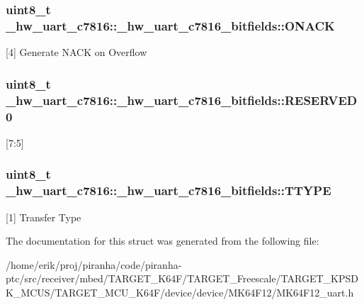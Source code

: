 \subsubsection[{\texorpdfstring{O\+N\+A\+CK}{ONACK}}]{\setlength{\rightskip}{0pt plus 5cm}uint8\+\_\+t \+\_\+hw\+\_\+uart\+\_\+c7816\+::\+\_\+hw\+\_\+uart\+\_\+c7816\+\_\+bitfields\+::\+O\+N\+A\+CK}\hypertarget{struct__hw__uart__c7816_1_1__hw__uart__c7816__bitfields_aab64c95bc1377e204598bee46957ade7}{}\label{struct__hw__uart__c7816_1_1__hw__uart__c7816__bitfields_aab64c95bc1377e204598bee46957ade7}
\mbox{[}4\mbox{]} Generate N\+A\+CK on Overflow 
\subsubsection[{\texorpdfstring{R\+E\+S\+E\+R\+V\+E\+D0}{RESERVED0}}]{\setlength{\rightskip}{0pt plus 5cm}uint8\+\_\+t \+\_\+hw\+\_\+uart\+\_\+c7816\+::\+\_\+hw\+\_\+uart\+\_\+c7816\+\_\+bitfields\+::\+R\+E\+S\+E\+R\+V\+E\+D0}\hypertarget{struct__hw__uart__c7816_1_1__hw__uart__c7816__bitfields_a16d6b831175a4c494e3145ef6cef56a0}{}\label{struct__hw__uart__c7816_1_1__hw__uart__c7816__bitfields_a16d6b831175a4c494e3145ef6cef56a0}
\mbox{[}7\+:5\mbox{]} 
\subsubsection[{\texorpdfstring{T\+T\+Y\+PE}{TTYPE}}]{\setlength{\rightskip}{0pt plus 5cm}uint8\+\_\+t \+\_\+hw\+\_\+uart\+\_\+c7816\+::\+\_\+hw\+\_\+uart\+\_\+c7816\+\_\+bitfields\+::\+T\+T\+Y\+PE}\hypertarget{struct__hw__uart__c7816_1_1__hw__uart__c7816__bitfields_a0c2ad54ab3c3b251db7f8f2c7c0a473a}{}\label{struct__hw__uart__c7816_1_1__hw__uart__c7816__bitfields_a0c2ad54ab3c3b251db7f8f2c7c0a473a}
\mbox{[}1\mbox{]} Transfer Type 

The documentation for this struct was generated from the following file\+:\begin{DoxyCompactItemize}
\item 
/home/erik/proj/piranha/code/piranha-\/ptc/src/receiver/mbed/\+T\+A\+R\+G\+E\+T\+\_\+\+K64\+F/\+T\+A\+R\+G\+E\+T\+\_\+\+Freescale/\+T\+A\+R\+G\+E\+T\+\_\+\+K\+P\+S\+D\+K\+\_\+\+M\+C\+U\+S/\+T\+A\+R\+G\+E\+T\+\_\+\+M\+C\+U\+\_\+\+K64\+F/device/device/\+M\+K64\+F12/M\+K64\+F12\+\_\+uart.\+h\end{DoxyCompactItemize}
